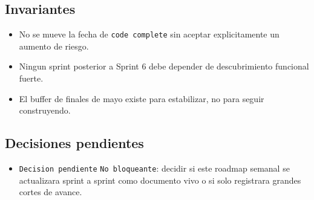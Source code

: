 \subsection{Invariantes}

\begin{itemize}
  \item No se mueve la fecha de \texttt{code complete} sin aceptar explicitamente un aumento de riesgo.
  \item Ningun sprint posterior a Sprint 6 debe depender de descubrimiento funcional fuerte.
  \item El buffer de finales de mayo existe para estabilizar, no para seguir construyendo.
\end{itemize}

\subsection{Decisiones pendientes}

\begin{itemize}
  \item \texttt{Decision pendiente} \texttt{No bloqueante}: decidir si este roadmap semanal se actualizara sprint a sprint como documento vivo o si solo registrara grandes cortes de avance.
\end{itemize}
